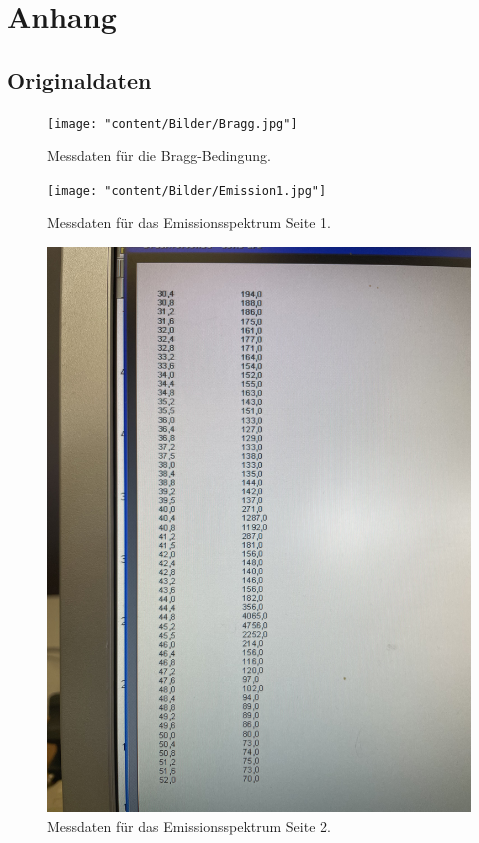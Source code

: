 \section{Anhang}
\label{sec:Anhang}
\subsection{Originaldaten}

\begin{figure}[H]
  \centering
  \texttt{[image: "content/Bilder/Bragg.jpg"]}
  \caption{Messdaten für die Bragg-Bedingung.}
  \label{fig:Messungen_1}
\end{figure}
\begin{figure}[H]
    \centering
    \texttt{[image: "content/Bilder/Emission1.jpg"]}
    \caption{Messdaten für das Emissionsspektrum Seite 1.}
    \label{fig:Messungen_2}
  \end{figure}
  \begin{figure}[H]
    \centering
    \includegraphics[width=\textwidth, angle=270, origin=c]{"content/Bilder/Emission2.jpg"}
    \caption{Messdaten für das Emissionsspektrum Seite 2.}
    \label{fig:Messungen_3}
  \end{figure}
